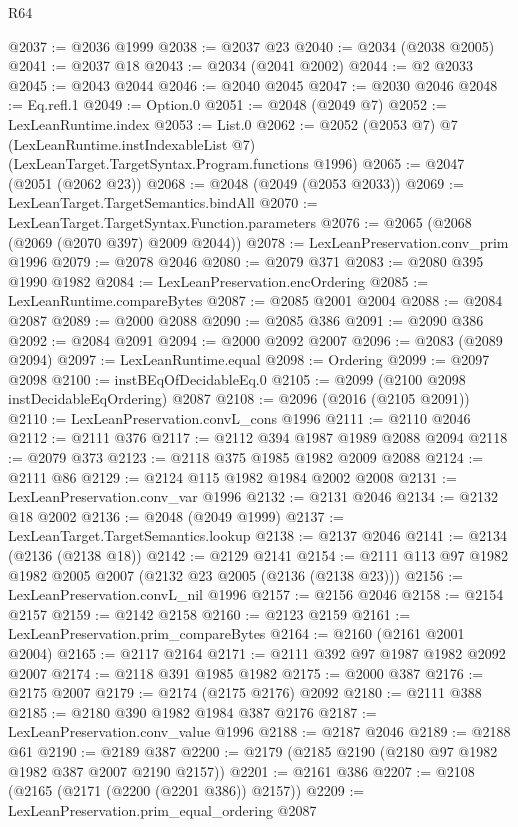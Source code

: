 \begin{lexlean}{R64}
\begin{coremodule}
@2037 := @2036 @1999
@2038 := @2037 @23
@2040 := @2034 (@2038 @2005)
@2041 := @2037 @18
@2043 := @2034 (@2041 @2002)
@2044 := @2 @2033
@2045 := @2043 @2044
@2046 := @2040 @2045
@2047 := @2030 @2046
@2048 := Eq.refl.{1}
@2049 := Option.{0}
@2051 := @2048 (@2049 @7)
@2052 := LexLeanRuntime.index
@2053 := List.{0}
@2062 := @2052
    (@2053 @7)
    @7
    (LexLeanRuntime.instIndexableList @7)
    (LexLeanTarget.TargetSyntax.Program.functions @1996)
@2065 := @2047 (@2051 (@2062 @23))
@2068 := @2048 (@2049 (@2053 @2033))
@2069 := LexLeanTarget.TargetSemantics.bindAll
@2070 := LexLeanTarget.TargetSyntax.Function.parameters
@2076 := @2065 (@2068 (@2069 (@2070 @397) @2009 @2044))
@2078 := LexLeanPreservation.conv_prim @1996
@2079 := @2078 @2046
@2080 := @2079 @371
@2083 := @2080 @395 @1990 @1982
@2084 := LexLeanPreservation.encOrdering
@2085 := LexLeanRuntime.compareBytes
@2087 := @2085 @2001 @2004
@2088 := @2084 @2087
@2089 := @2000 @2088
@2090 := @2085 @386
@2091 := @2090 @386
@2092 := @2084 @2091
@2094 := @2000 @2092 @2007
@2096 := @2083 (@2089 @2094)
@2097 := LexLeanRuntime.equal
@2098 := Ordering
@2099 := @2097 @2098
@2100 := instBEqOfDecidableEq.{0}
@2105 := @2099 (@2100 @2098 instDecidableEqOrdering) @2087
@2108 := @2096 (@2016 (@2105 @2091))
@2110 := LexLeanPreservation.convL_cons @1996
@2111 := @2110 @2046
@2112 := @2111 @376
@2117 := @2112 @394 @1987 @1989 @2088 @2094
@2118 := @2079 @373
@2123 := @2118 @375 @1985 @1982 @2009 @2088
@2124 := @2111 @86
@2129 := @2124 @115 @1982 @1984 @2002 @2008
@2131 := LexLeanPreservation.conv_var @1996
@2132 := @2131 @2046
@2134 := @2132 @18 @2002
@2136 := @2048 (@2049 @1999)
@2137 := LexLeanTarget.TargetSemantics.lookup
@2138 := @2137 @2046
@2141 := @2134 (@2136 (@2138 @18))
@2142 := @2129 @2141
@2154 := @2111 @113 @97 @1982 @1982 @2005 @2007 (@2132 @23 @2005 (@2136 (@2138 @23)))
@2156 := LexLeanPreservation.convL_nil @1996
@2157 := @2156 @2046
@2158 := @2154 @2157
@2159 := @2142 @2158
@2160 := @2123 @2159
@2161 := LexLeanPreservation.prim_compareBytes
@2164 := @2160 (@2161 @2001 @2004)
@2165 := @2117 @2164
@2171 := @2111 @392 @97 @1987 @1982 @2092 @2007
@2174 := @2118 @391 @1985 @1982
@2175 := @2000 @387
@2176 := @2175 @2007
@2179 := @2174 (@2175 @2176) @2092
@2180 := @2111 @388
@2185 := @2180 @390 @1982 @1984 @387 @2176
@2187 := LexLeanPreservation.conv_value @1996
@2188 := @2187 @2046
@2189 := @2188 @61
@2190 := @2189 @387
@2200 := @2179 (@2185 @2190 (@2180 @97 @1982 @1982 @387 @2007 @2190 @2157))
@2201 := @2161 @386
@2207 := @2108 (@2165 (@2171 (@2200 (@2201 @386)) @2157))
@2209 := LexLeanPreservation.prim_equal_ordering @2087

\end{coremodule}
\end{lexlean}
